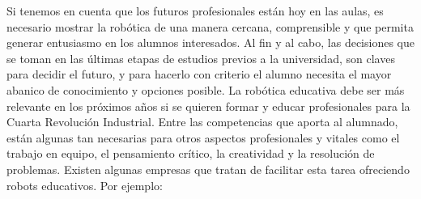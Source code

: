 \documentclass[12pt,spanish,chapterprefix, numbers=noenddot]{book}
\numberwithin{equation}{section}
\numberwithin{figure}{section}
\begin{document}
Si tenemos en cuenta que los futuros profesionales están hoy en las aulas, es necesario mostrar la robótica de una manera cercana, comprensible y que permita generar entusiasmo en los alumnos interesados. Al fin y al cabo, las decisiones que se toman en las últimas etapas de estudios previos a la universidad, son claves para decidir el futuro, y para hacerlo con criterio el alumno necesita el mayor abanico de conocimiento y opciones posible. 
La robótica educativa debe ser más relevante en los próximos años si se quieren formar y educar profesionales para la Cuarta Revolución Industrial. Entre las competencias que aporta al alumnado, están algunas tan necesarias para otros aspectos profesionales y vitales como el trabajo en equipo, el pensamiento crítico, la creatividad y la resolución de problemas. Existen algunas empresas que tratan de facilitar esta tarea ofreciendo robots educativos. Por ejemplo: 
\end{document}
